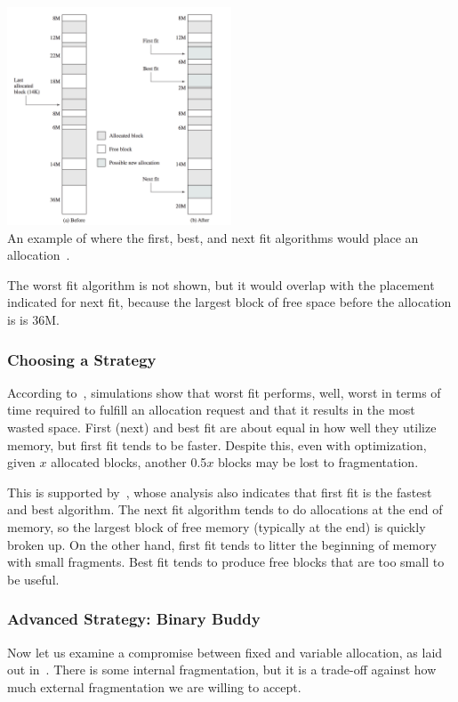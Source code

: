 \begin{center}
\includegraphics[width=0.50\textwidth]{images/first-best-next.png}\\
An example of where the first, best, and next fit algorithms would place an allocation~\cite{osi}.
\end{center}

The worst fit algorithm is not shown, but it would overlap with the placement indicated for next fit, because the largest block of free space before the allocation is is 36M.

\subsubsection*{Choosing a Strategy}

According to~\cite{osc}, simulations show that worst fit performs, well, worst in terms of time required to fulfill an allocation request and that it results in the most wasted space. First (next) and best fit are about equal in how well they utilize memory, but first fit tends to be faster. Despite this, even with optimization, given $x$ allocated blocks, another 0.5$x$ blocks may be lost to fragmentation.

This is supported by~\cite{osi}, whose analysis also indicates that first fit is the fastest and best algorithm. The next fit algorithm tends to do allocations at the end of memory, so the largest block of free memory (typically at the end) is quickly broken up. On the other hand, first fit tends to litter the beginning of memory with small fragments. Best fit tends to produce free blocks that are too small to be useful. 

\subsubsection*{Advanced Strategy: Binary Buddy}
Now let us examine a compromise between fixed and variable allocation, as laid out in~\cite{osi}. There is some internal fragmentation, but it is a trade-off against how much external fragmentation we are willing to accept.

